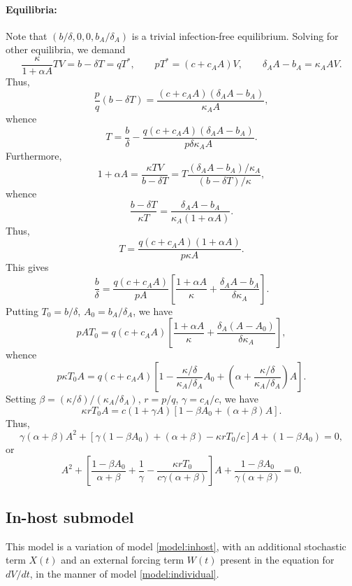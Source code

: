 \documentclass[11pt]{article}
\numberwithin{equation}{subsection}
\begin{document}
    \paragraph{Equilibria:} Note that $(b / \delta, 0, 0, b_A / \delta_A)$ is
    a trivial infection-free equilibrium. Solving for other equilibria, we
    demand \[
        \frac{\kappa}{1 + \alpha A} TV = b - \delta T = q T^*, \qquad
        pT^* = (c + c_A A)V, \qquad
        \delta_A A  - b_A = \kappa_A AV.
    \] Thus, \[
        \frac{p}{q}(b - \delta T) = \frac{(c + c_A A)(\delta_A A - b_A)}{\kappa_A A},
    \] whence \[
        T = \frac{b}{\delta} - \frac{q(c + c_A A)(\delta_A A - b_A)}{p \delta \kappa_A A}.
    \] Furthermore, \[
        1 + \alpha A = \frac{\kappa TV}{b - \delta T} = T \frac{(\delta_A A - b_A) / \kappa_A}{(b - \delta T) / \kappa},
    \] whence \[
        \frac{b - \delta T}{\kappa T} = \frac{\delta_A A - b_A}{\kappa_A (1 + \alpha A)}.
    \] Thus, \[
        T  = \frac{q(c + c_A A)(1 + \alpha A)}{p\kappa A}.
    \] This gives \[
        \frac{b}{\delta} = \frac{q(c + c_A A)}{pA}\left[\frac{1 + \alpha A}{\kappa} + \frac{\delta_A A - b_A}{\delta \kappa_A}\right].
    \] Putting $T_0 = b / \delta$, $A_0 = b_A / \delta_A$, we have \[
        pAT_0 = q(c + c_A A)\left[\frac{1 + \alpha A}{\kappa} + \frac{\delta_A(A - A_0)}{\delta \kappa_A}\right],
    \] whence \[
        p\kappa T_0 A
        = q(c + c_A A)\left[1 - \frac{\kappa/\delta}{\kappa_A/\delta_A}A_0 + \left(\alpha + \frac{\kappa / \delta}{\kappa_A / \delta_A}\right)A\right].
    \] Setting $\beta = (\kappa / \delta) / (\kappa_A / \delta_A)$, $r = p /
    q$, $\gamma = c_A / c$, we have \[
        \kappa r T_0 A = c(1 + \gamma A)[1 - \beta A_0 + (\alpha + \beta)A].
    \] Thus, \[
        \gamma(\alpha + \beta)A^2 + [\gamma(1 - \beta A_0) + (\alpha + \beta) - \kappa r T_0 / c] A + (1 - \beta A_0) = 0,
    \] or \[
        A^2 + \left[\frac{1 - \beta A_0}{\alpha + \beta} + \frac{1}{\gamma} - \frac{\kappa r T_0}{c\gamma(\alpha + \beta)}\right] A + \frac{1 - \beta A_0}{\gamma(\alpha + \beta)} = 0.
    \]


    \subsection{In-host submodel} \label{model:inhost_stochastic}

    This model is a variation of model \ref{model:inhost}, with an additional
    stochastic term $X(t)$ and an external forcing term $W(t)$ present in the
    equation for $dV/dt$, in the manner of model \ref{model:individual}.
\end{document}
